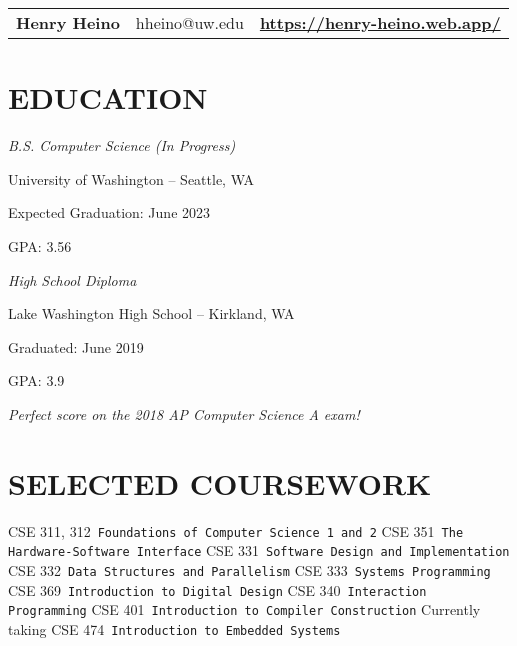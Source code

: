 \documentclass[12pt,letterpaper]{extarticle}
\begin{document}
  \setlength\parindent{0em}
  \begin{tabular}{lcr}
    {\huge \textbf{Henry Heino}} & hheino@uw.edu & {\large \textbf{\url{https://henry-heino.web.app/}}}
  \end{tabular}
  \section{EDUCATION}
  \emph{B.S. Computer Science (In Progress)}
  \begin{addmargin}[2em]{0em}
    \par University of Washington -- Seattle, WA
    \par Expected Graduation: June 2023
    \par GPA: 3.56
  \end{addmargin}

  \emph{High School Diploma}
  \begin{addmargin}[2em]{0em}
    \par Lake Washington High School -- Kirkland, WA
    \par Graduated: June 2019
    \par GPA: 3.9
    \par \emph{\footnotesize{Perfect score on the 2018 AP Computer Science A exam!}}
  \end{addmargin}
  \section{SELECTED COURSEWORK}
  \begin{addmargin}[2em]{2em}
    \def\cseRf#1#2{CSE #1\ \hfill \texttt{\small #2}}
    \def\cseSp{\newline }

    \cseRf{311, 312}{Foundations of Computer Science 1 and 2}
    \cseSp{}\cseRf{351}{The Hardware-Software Interface}
    \cseSp{}\cseRf{331}{Software Design and Implementation}
    \cseSp{}\cseRf{332}{Data Structures and Parallelism}
    \cseSp{}\cseRf{333}{Systems Programming}
    \cseSp{}\cseRf{369}{Introduction to Digital Design}
    \cseSp{}\cseRf{340}{Interaction Programming}
    \cseSp{}\cseRf{401}{Introduction to Compiler Construction}
    \cseSp{} Currently taking \cseRf{474}{Introduction to Embedded Systems}
  \end{addmargin}
\end{document}
